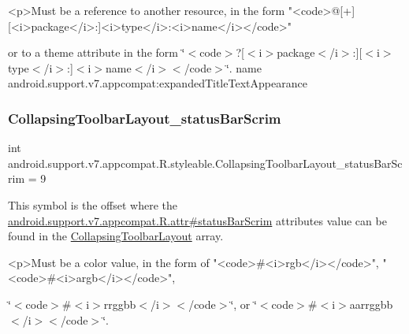 \begin{DoxyVerb}      <p>Must be a reference to another resource, in the form "<code>@[+][<i>package</i>:]<i>type</i>:<i>name</i></code>"
\end{DoxyVerb}
 or to a theme attribute in the form \char`\"{}$<$code$>$?\mbox{[}$<$i$>$package$<$/i$>$\+:\mbox{]}\mbox{[}$<$i$>$type$<$/i$>$\+:\mbox{]}$<$i$>$name$<$/i$>$$<$/code$>$\char`\"{}.  name android.\+support.\+v7.\+appcompat\+:expanded\+Title\+Text\+Appearance \mbox{\label{classandroid_1_1support_1_1v7_1_1appcompat_1_1R_1_1styleable_a8dd3d1989f1de8df8670da0cf881bb53}} 
\subsubsection{\texorpdfstring{Collapsing\+Toolbar\+Layout\+\_\+status\+Bar\+Scrim}{CollapsingToolbarLayout\_statusBarScrim}}
{\footnotesize\ttfamily int android.\+support.\+v7.\+appcompat.\+R.\+styleable.\+Collapsing\+Toolbar\+Layout\+\_\+status\+Bar\+Scrim = 9\hspace{0.3cm}{\ttfamily [static]}}

This symbol is the offset where the \hyperlink{classandroid_1_1support_1_1v7_1_1appcompat_1_1R_1_1attr_acfaccc406e612fb6fae81417220d3286}{android.\+support.\+v7.\+appcompat.\+R.\+attr\#status\+Bar\+Scrim} attribute\textquotesingle{}s value can be found in the \hyperlink{classandroid_1_1support_1_1v7_1_1appcompat_1_1R_1_1styleable_a8d282d917f35e5a08dd37db243410383}{Collapsing\+Toolbar\+Layout} array.

\begin{DoxyVerb}      <p>Must be a color value, in the form of "<code>#<i>rgb</i></code>", "<code>#<i>argb</i></code>",
\end{DoxyVerb}
 \char`\"{}$<$code$>$\#$<$i$>$rrggbb$<$/i$>$$<$/code$>$\char`\"{}, or \char`\"{}$<$code$>$\#$<$i$>$aarrggbb$<$/i$>$$<$/code$>$\char`\"{}. 

